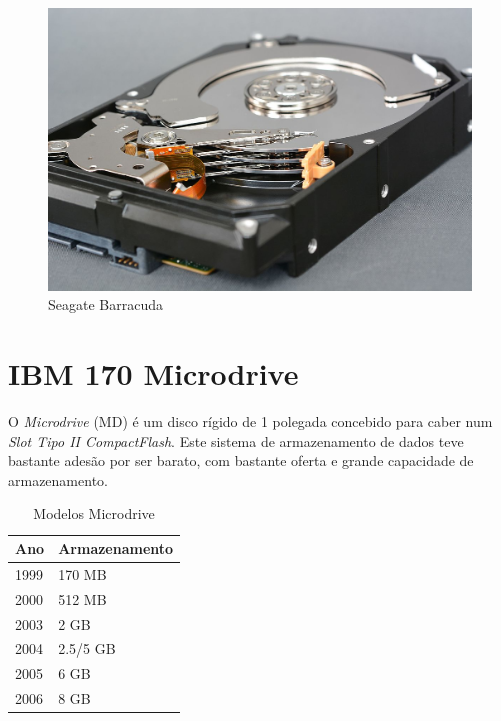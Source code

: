 \documentclass{report}
\begin{document}
	\begin{figure} [h]
		\centering
		\includegraphics[scale=0.7]{barracuda.jpg}
		\caption{Seagate Barracuda}
	\end{figure}
	
\newpage
	
		\section{IBM 170 Microdrive}
	
	O \textit{Microdrive} (MD) é um disco rígido de 1 polegada concebido para caber num \textit{Slot Tipo II CompactFlash}.
	Este sistema de armazenamento de dados teve bastante adesão por ser barato, com bastante oferta e grande capacidade de armazenamento. 
	
	\begin{table}[h]
		\centering
		\caption{Modelos Microdrive} 
		\vspace{2mm}
		\label{Tabela de Microdive}
		\begin{tabular}{|l|l|}
		\hline
		\textbf{Ano} & \textbf{Armazenamento} \\ \hline
			1999 & 170  MB \\ \hline
			2000 & 512  MB \\ \hline
			2003 & 2  GB \\ \hline
			2004 & 2.5/5  GB  \\ \hline
			2005 & 6  GB  \\ \hline
			2006 & 8  GB  \\ \hline
			\end{tabular}
		\end{table}
	
\end{document}
